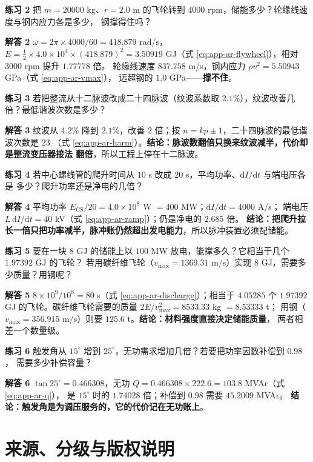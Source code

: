 \textbf{练习 2}
把 $m=20000$ kg、$r=2.0$ m 的飞轮转到 $4000$ rpm，储能多少？轮缘线速度与钢内应力各是多少，
钢撑得住吗？

\textbf{解答 2}
$\omega=2\pi\times4000/60=418.879$ rad/s，$E=\tfrac12\times4.0\times10^{4}\times(418.879)^2
=3.50919$ GJ（式 \eqref{eq:app-ar-flywheel}），相对 $3000$ rpm 提升 $1.77778$ 倍。
轮缘线速度 $837.758$ m/s，钢内应力 $\rho v^2=5.50943$ GPa（式 \eqref{eq:app-ar-vmax}），
远超钢的 $1.0$ GPa——\textbf{撑不住}。

\textbf{练习 3}
若把整流从十二脉波改成二十四脉波（纹波系数取 $2.1\%$），纹波改善几倍？最低谐波次数是多少？

\textbf{解答 3}
纹波从 $4.2\%$ 降到 $2.1\%$，改善 $2$ 倍；按 $n=kp\pm1$，二十四脉波的最低谐波次数是 $23$
（式 \eqref{eq:app-ar-harm}）。\textbf{结论：脉波数翻倍只换来纹波减半，代价却是整流变压器接法
翻倍}，所以工程上停在十二脉波。

\textbf{练习 4}
若中心螺线管的爬升时间从 $10$ s 改成 $20$ s，平均功率、$\mathrm{d}I/\mathrm{d}t$ 与端电压各是
多少？爬升功率还是净电的几倍？

\textbf{解答 4}
平均功率 $E_\mathrm{CS}/20=4.0\times10^{8}$ W $=400$ MW；$\mathrm{d}I/\mathrm{d}t=4000$ A/s；
端电压 $L\,\mathrm{d}I/\mathrm{d}t=40$ kV（式 \eqref{eq:app-ar-ramp}）；仍是净电的 $2.685$ 倍。
\textbf{结论：把爬升拉长一倍只把功率减半，脉冲账仍然超出发电能力}，所以脉冲装置必须配储能。

\textbf{练习 5}
要在一块 $8$ GJ 的储能上以 $100$ MW 放电，能撑多久？它相当于几个 $1.97392$ GJ 的飞轮？
若用碳纤维飞轮（$v_\mathrm{max}=1369.31$ m/s）实现 $8$ GJ，需要多少质量？用钢呢？

\textbf{解答 5}
$8\times10^{9}/10^{8}=80$ s（式 \eqref{eq:app-ar-discharge}）；相当于 $4.05285$ 个
$1.97392$ GJ 的飞轮。碳纤维飞轮需要的质量 $2E/v_\mathrm{max}^2=8533.33$ kg $=8.53333$ t；
用钢（$v_\mathrm{max}=356.915$ m/s）则要 $125.6$ t。\textbf{结论：材料强度直接决定储能质量}，
两者相差一个数量级。

\textbf{练习 6}
触发角从 $15^\circ$ 增到 $25^\circ$，无功需求增加几倍？若要把功率因数补偿到 $0.98$，
需要多少补偿容量？

\textbf{解答 6}
$\tan25^\circ=0.466308$，无功 $Q=0.466308\times222.6=103.8$ MVAr（式 \eqref{eq:app-ar-q}），
是 $15^\circ$ 时的 $1.74028$ 倍；补偿到 $0.98$ 需要 $45.2009$ MVAr。
\textbf{结论：触发角是为调压服务的，它的代价记在无功账上}。

\section{来源、分级与版权说明}
\label{sec:app-ar-source}

